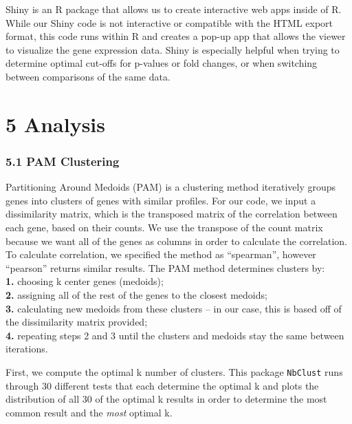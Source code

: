 \documentclass[]{article}
\begin{document}
Shiny is an R package that allows us to create interactive web apps
inside of R. While our Shiny code is not interactive or compatible with
the HTML export format, this code runs within R and creates a pop-up app
that allows the viewer to visualize the gene expression data. Shiny is
especially helpful when trying to determine optimal cut-offs for
p-values or fold changes, or when switching between comparisons of the
same data.

\section{\texorpdfstring{\textbf{5}
Analysis}{5 Analysis}}\label{analysis}

\subsubsection{\texorpdfstring{\textbf{5.1} PAM
Clustering}{5.1 PAM Clustering}}\label{pam-clustering}

Partitioning Around Medoids (PAM) is a clustering method iteratively
groups genes into clusters of genes with similar profiles. For our code,
we input a dissimilarity matrix, which is the transposed matrix of the
correlation between each gene, based on their counts. We use the
transpose of the count matrix because we want all of the genes as
columns in order to calculate the correlation. To calculate correlation,
we specified the method as ``spearman'', however ``pearson'' returns
similar results. The PAM method determines clusters by:\\
\textbf{1.} choosing k center genes (medoids);\\
\textbf{2.} assigning all of the rest of the genes to the closest
medoids;\\
\textbf{3.} calculating new medoids from these clusters -- in our case,
this is based off of the dissimilarity matrix provided;\\
\textbf{4.} repeating steps 2 and 3 until the clusters and medoids stay
the same between iterations.

First, we compute the optimal k number of clusters. This package
\texttt{NbClust} runs through 30 different tests that each determine the
optimal k and plots the distribution of all 30 of the optimal k results
in order to determine the most common result and the \emph{most} optimal
k.
\end{document}
